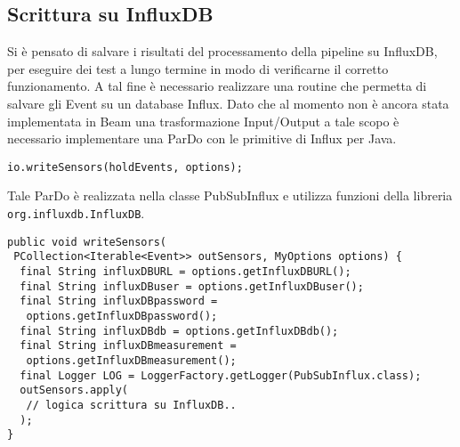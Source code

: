 \subsection{Scrittura su InfluxDB}
Si è pensato di salvare i risultati del processamento della pipeline su InfluxDB, per eseguire dei test a lungo termine in modo di verificarne il corretto funzionamento. A tal fine è necessario realizzare una routine che permetta di salvare gli Event su un database Influx. Dato che al momento non è ancora stata implementata in Beam una trasformazione Input/Output a tale scopo \cite{onofre_2017} è necessario implementare una ParDo con le primitive di Influx per Java.
\begin{lstlisting}
io.writeSensors(holdEvents, options);
\end{lstlisting}
Tale ParDo è realizzata nella classe PubSubInflux e utilizza funzioni della libreria \texttt{org.\allowbreak influxdb.\allowbreak InfluxDB}.
\begin{lstlisting}
public void writeSensors(
 PCollection<Iterable<Event>> outSensors, MyOptions options) {
  final String influxDBURL = options.getInfluxDBURL();
  final String influxDBuser = options.getInfluxDBuser();
  final String influxDBpassword = 
   options.getInfluxDBpassword();
  final String influxDBdb = options.getInfluxDBdb();
  final String influxDBmeasurement = 
   options.getInfluxDBmeasurement();
  final Logger LOG = LoggerFactory.getLogger(PubSubInflux.class);
  outSensors.apply(
   // logica scrittura su InfluxDB..
  );
}
\end{lstlisting}
